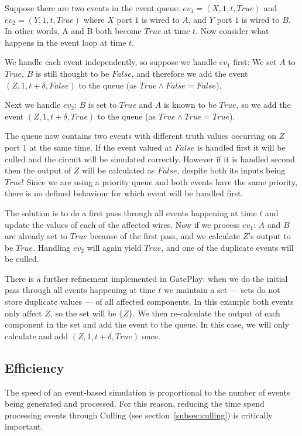 Suppose there are two events in the event queue: $ev_1 = (X, 1, t, True)$ and $ev_2 = (Y, 1, t, True)$ where $X$ port $1$ is wired to $A$, and $Y$ port $1$ is wired to $B$.  In other words, A and B both become $True$ at time $t$. Now consider what happens in the event loop at time $t$.

We handle each event independently, so suppose we handle $ev_1$ first: We set $A$ to $True$, $B$ is still thought to be $False$, and therefore we add the event $(Z, 1, t + \delta, False)$ to the queue (as $True \land False = False$).

Next we handle $ev_2$: $B$ is set to $True$ and $A$ is known to be $True$, so we add the event $(Z, 1, t + \delta, True)$ to the queue (as $True \land True = True$).

The queue now contains two events with different truth values occurring on $Z$ port $1$ at the same time. If the event valued at $False$ is handled first it will be culled and the circuit will be simulated correctly. However if it is handled second then the output of $Z$ will be calculated as $False$, despite both its inputs being $True$! Since we are using a priority queue and both events have the same priority, there is no defined behaviour for which event will be handled first.

The solution is to do a first pass through all events happening at time $t$ and update the values of each of the affected wires. Now if we process $ev_1$: $A$ and $B$ are already set to $True$ because of the first pass, and we calculate $Z$'s output to be $True$. Handling $ev_2$ will again yield $True$, and one of the duplicate events will be culled.

There is a further refinement implemented in GatePlay: when we do the initial pass through all events happening at time $t$ we maintain a set --- sets do not store duplicate values --- of all affected components. In this example both events only affect $Z$, so the set will be $\{Z\}$. We then re-calculate the output of each component in the set and add the event to the queue. In this case, we will only calculate and add $(Z, 1, t + \delta, True)$ once.

\subsection{Efficiency}
The speed of an event-based simulation is proportional to the number of events being generated and processed. For this reason, reducing the time spend processing events through Culling (see section~\ref{subsec:culling}) is critically important.

